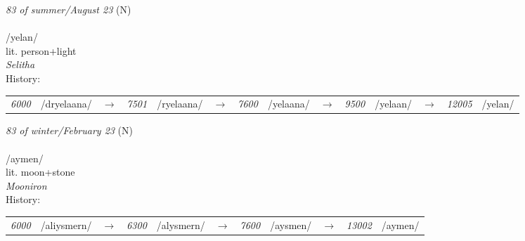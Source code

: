 \vspace{15pt}
\begin{nopagebreak}
 \textit{83 of summer/August 23} (N)\\
\\
\noindent /y{\textprimstress}elan/\\
\noindent lit. person+light\\
\noindent \textit{Selitha}\\


\noindent History:

\vspace{-0pt}
\hspace{40pt}
\begin{tabular}{ccc}
\textit{6000} & /dryelaana/&$\rightarrow$ & \textit{7501} & /ryelaana/&$\rightarrow$ & \textit{7600} & /yelaana/&$\rightarrow$ & \textit{9500} & /yelaan/&$\rightarrow$ & \textit{12005} & /yelan/& \\
\end{tabular}

\vspace{20pt}\hline

\end{nopagebreak}
\filbreak



\vspace{15pt}
\begin{nopagebreak}
 \textit{83 of winter/February 23} (N)\\
\\
\noindent /{\textprimstress}aymen/\\
\noindent lit. moon+stone\\
\noindent \textit{Mooniron}\\


\noindent History:

\vspace{-0pt}
\hspace{40pt}
\begin{tabular}{ccc}
\textit{6000} & /aliysmern/&$\rightarrow$ & \textit{6300} & /alysmern/&$\rightarrow$ & \textit{7600} & /aysmen/&$\rightarrow$ & \textit{13002} & /aymen/& \\
\end{tabular}

\vspace{20pt}\hline

\end{nopagebreak}
\filbreak



